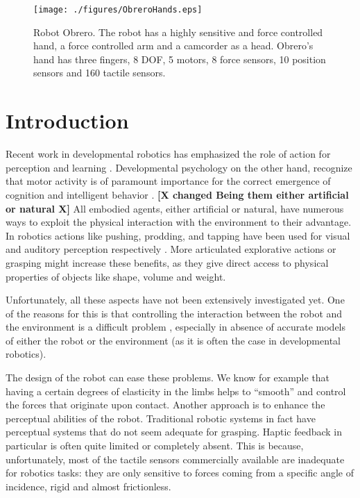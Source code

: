 \begin{figure}[tbp]
\centerline{
\texttt{[image: ./figures/ObreroHands.eps]}
} \caption{Robot Obrero. The robot has a highly sensitive and
force controlled hand, a force controlled arm and a
camcorder as a head. Obrero's hand  has three fingers, 8 DOF, 5
motors, 8 force sensors, 10 position sensors and 160 tactile
sensors.} \label{fig:RobotObrero}
\end{figure}

\section{Introduction}

Recent work in developmental robotics has emphasized the role of
action for perception and learning
\cite{metta03early,natale04learning,natale05from}. Developmental
psychology on the other hand, recognize that motor activity is of
paramount importance for the correct emergence of cognition and
intelligent behavior \cite{streri93Seeing,bushnell93motor}.
\textbf{[X changed Being them either artificial or natural X]} All
embodied agents, either artificial or natural, have numerous ways
to exploit the physical interaction with the environment to their
advantage. In robotics actions like pushing, prodding, and tapping
have been used for visual and auditory perception respectively
\cite{metta03early,etorresjara05tapping}. More articulated
explorative actions or grasping might increase these benefits, as
they give direct access to physical properties of objects like
shape, volume and weight.

Unfortunately, all these aspects have not been extensively
investigated yet. One of the reasons for this is that controlling
the interaction between the robot and the environment is a
difficult problem \cite{volpe90real}, especially in absence of
accurate models of either the robot or the environment (as it is
often the case in developmental robotics).


The design of the robot can ease these problems. We know for
example that having a certain degrees of elasticity in the limbs
helps to ``smooth''  and control the forces that originate upon
contact. Another approach is to enhance the perceptual abilities
of the robot. Traditional robotic systems in fact have perceptual
systems that do not seem adequate for grasping. Haptic feedback in
particular is often quite limited or completely absent. This is
because, unfortunately, most of the tactile sensors commercially
available are inadequate for robotics tasks: they are only
sensitive to forces coming from a specific angle of incidence,
rigid and almost frictionless.

